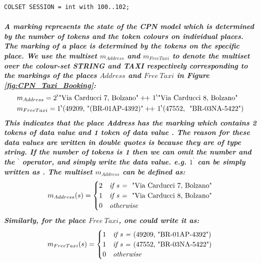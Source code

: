 \begin{verbatim}
COLSET SESSION = int with 100..102;
\end{verbatim}

\subparagraph*{\textnormal{A \textit{marking} represents the state of the CPN model which is determined by the number of tokens and the token colours on individual places. The marking of a place is determined by the tokens on the specific place. We use the multiset $\mathit{m_{Address}}$ and $\mathit{m_{Free Taxi}}$ to denote the multiset over the colour-set STRING and TAXI respectively corresponding to the markings of the places $\mathit{Address}$ and $\mathit{Free\ Taxi}$ in Figure \ref{fig:CPN_Taxi_Booking}:
\begin{equation*}
\begin{aligned}
&m_{Address} = {2}^{\backprime}\textnormal{"Via Carducci 7, Bolzano"} +\!\!+\ {1}^{\backprime}\textnormal{"Via Carducci 8, Bolzano"}\\
&m_{Free Taxi} = {1}^{\backprime}\textnormal{(49209,\bdsq{(BR-01AP-4392)}} +\!\!+\ {1}^{\backprime}\textnormal{(47552, \bdsq{BR-03NA-5422})}
\end{aligned}
\end{equation*}
This indicates that the place \textit{Address} has the marking which contains 2 tokens of data value  and 1 token of data value . The reason for these data values are written in double quotes is because they are of type string. If the number of tokens is 1 then we can omit the number and the ${}^{\backprime}$ operator, and simply write the data value. e.g. ${1}^{\backprime}$ can be simply written as . The multiset $m_{Address}$ can be defined as:
\begin{equation*}
m_{Address}(s) = \begin{cases}
2 & \textit{if s = \textnormal{\bdsq{Via Carducci 7, Bolzano}}} \\ 
1 & \textit{if s = \textnormal{\bdsq{Via Carducci 8, Bolzano}}} \\ 
0 & \textit{otherwise}
\end{cases}
\end{equation*}
Similarly, for the place $\mathit{Free\ Taxi}$, one could write it as:
\begin{equation*}
m_{Free Taxi}(s) = \begin{cases}
1 & \textit{if s = \textnormal{(49209,\bdsq{BR-01AP-4392})}} \\ 
1 & \textit{if s = \textnormal{(47552,\bdsq{BR-03NA-5422})}} \\ 
0 & \textit{otherwise} 
\end{cases}
\end{equation*}}}

